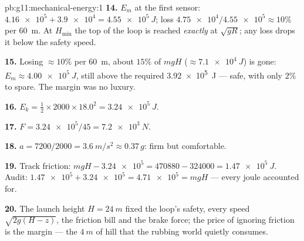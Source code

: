 \begin{solution}{pb:g11:mechanical-energy:1}
\textbf{14.} $E_m$ at the first sensor: $\num{4.16e5} + \num{3.9e4} =
\qty{4.55e5}{J}$; loss $\num{4.75e4}/\num{4.55e5} \approx 10\%$ per
\qty{60}{m}. At $H_{\min}$ the top of the loop is reached \emph{exactly}
at $\sqrt{gR}$; any loss drops it below the safety speed.

\textbf{15.} Losing $\approx 10\%$ per \qty{60}{m}, about $15\%$ of
$mgH$ ($\approx \qty{7.1e4}{J}$) is gone: $E_m \approx \qty{4.00e5}{J}$,
still above the required \qty{3.92e5}{J} --- safe, with only $2\%$ to
spare. The margin was no luxury.

\textbf{16.} $E_k = \tfrac12 \times 2000 \times 18.0^2 =
\qty{3.24e5}{J}$.

\textbf{17.} $F = \num{3.24e5}/45 = \qty{7.2e3}{N}$.

\textbf{18.} $a = 7200/2000 = \qty{3.6}{m/s^2} \approx 0.37\,g$:
firm but comfortable.

\textbf{19.} Track friction: $mgH - \num{3.24e5} = \num{470880} -
\num{324000} = \qty{1.47e5}{J}$. Audit: $\num{1.47e5} + \num{3.24e5} =
\num{4.71e5} = mgH$ --- every joule accounted for.

\textbf{20.} The launch height $H = \qty{24}{m}$ fixed the loop's
safety, every speed $\sqrt{2g(H - z)}$, the friction bill and the brake
force; the price of ignoring friction is the margin --- the $\qty{4}{m}$
of hill that the rubbing world quietly consumes.
\end{solution}
